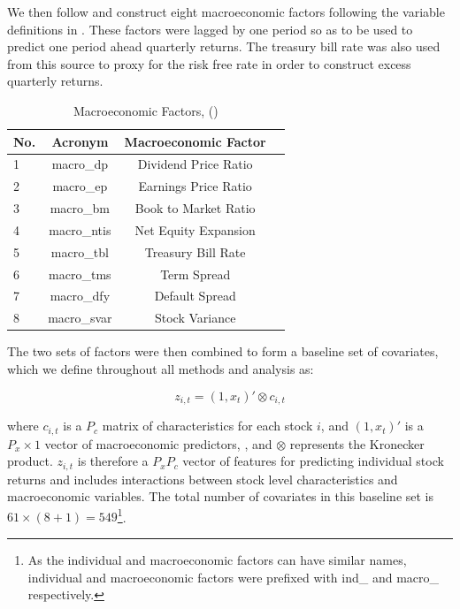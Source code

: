 \documentclass{article}
\begin{document}
We then follow \cite{gu_empirical_2018} and construct eight macroeconomic factors following the variable definitions in \cite{welch_comprehensive_2008}. These factors were lagged by one period so as to be used to predict one period ahead quarterly returns. The treasury bill rate was also used from this source to proxy for the risk free rate in order to construct excess quarterly returns. 

\begin{table}
	\caption{Macroeconomic Factors, (\cite{welch_comprehensive_2008})}
	\label{macro_factors}
	\begin{center}
		\begin{tabular}{lccc} \hline
			No. & Acronym & Macroeconomic Factor \\ \hline
			1 & macro\_dp & Dividend Price Ratio \\
			2 & macro\_ep & Earnings Price Ratio \\
			3 & macro\_bm & Book to Market Ratio \\
			4 & macro\_ntis & Net Equity Expansion \\
			5 & macro\_tbl & Treasury Bill Rate \\
			6 & macro\_tms & Term Spread \\
			7 & macro\_dfy & Default Spread \\
			8 & macro\_svar & Stock Variance \\ \hline
		\end{tabular}
	\end{center}
\end{table}

The two sets of factors were then combined to form a baseline set of covariates, which we define throughout all methods and analysis as:

\begin{equation}
z_{i,t} = (1, x_t)' \otimes c_{i, t}
\end{equation}

where $c_{i,t}$ is a $P_c$ matrix of characteristics for each stock $i$, and $(1, x_t)'$ is a $P_x \times 1$ vector of macroeconomic predictors, , and $\otimes$ represents the Kronecker product. $z_{i,t}$ is therefore a $P_x P_c$ vector of features for predicting individual stock returns and includes interactions between stock level characteristics and macroeconomic variables. The total number of covariates in this baseline set is $61 \times (8 + 1) = 549$\footnote{As the individual and macroeconomic factors can have similar names, individual and macroeconomic factors were prefixed with ind\_ and macro\_ respectively.}.
\end{document}

